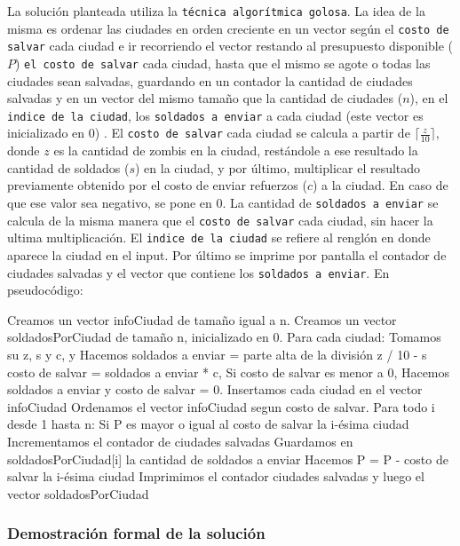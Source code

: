 La solución planteada utiliza la \texttt{técnica algorítmica golosa}. La idea de la misma es ordenar las ciudades en orden creciente en un vector según el \texttt{costo de salvar} cada ciudad e ir recorriendo el vector restando al presupuesto disponible ($P$) \texttt{el costo de salvar} cada ciudad, hasta que el mismo se agote o todas las ciudades sean salvadas, guardando en un contador la cantidad de ciudades salvadas y en un vector del mismo tamaño que la cantidad de ciudades ($n$), en el \texttt{indice de la ciudad}, los \texttt{soldados a enviar} a cada ciudad (este vector es inicializado en 0) . El \texttt{costo de salvar} cada ciudad se calcula a partir de $\lceil \frac{z}{10} \rceil$, donde $z$ es la cantidad de zombis en la ciudad, restándole a ese resultado la cantidad de soldados ($s$) en la ciudad, y por último, multiplicar el resultado previamente obtenido por el costo de enviar refuerzos ($c$) a la ciudad. En caso de que ese valor sea negativo, se pone en 0. La cantidad de \texttt{soldados a enviar} se calcula de la misma manera que el \texttt{costo de salvar} cada ciudad, sin hacer la ultima multiplicación. El \texttt{indice de la ciudad} se refiere al renglón en donde aparece la ciudad en el input. Por último se imprime por pantalla el contador de ciudades salvadas y el vector que contiene los \texttt{soldados a enviar}.
En pseudocódigo:
\newline \newline
\begin{codesnippet}
Creamos un vector infoCiudad de tamaño igual a n.
Creamos un vector soldadosPorCiudad de tamaño n, inicializado en 0.
Para cada ciudad: 
	Tomamos su z, s y c, y
	Hacemos soldados a enviar = parte alta de la división z / 10  - s 
	costo de salvar = soldados a enviar * c,
	Si costo de salvar es menor a 0, 
    	     Hacemos soldados a enviar y costo de salvar = 0.
        Insertamos cada ciudad en el vector infoCiudad
Ordenamos el vector infoCiudad segun costo de salvar.
Para todo i desde 1 hasta n:
 	Si P es mayor o igual al costo de salvar la i-ésima ciudad 
  		Incrementamos el contador de ciudades salvadas
  		Guardamos en soldadosPorCiudad[i] la cantidad de soldados a enviar
        	  Hacemos P = P - costo de salvar la i-ésima ciudad
Imprimimos el contador ciudades salvadas y luego el vector soldadosPorCiudad
\end{codesnippet}


\subsubsection{Demostración formal de la solución}

